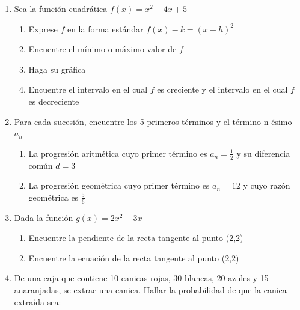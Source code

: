 \documentclass[letterpaper,fleqn]{article}
\begin{document}
\begin{enumerate}
\begin{enumerate}
\begin{enumerate}
\end{enumerate}
\end{enumerate}
\item Sea la función cuadrática $f(x)=x^{2}-4x+5$
\begin{enumerate}
\item Exprese $f$ en la forma estándar $f(x)-k=(x-h)^{2}$\noanswer
\newpage
\item Encuentre el mínimo o máximo valor de $f$\noanswer[20pt]
\item Haga su gráfica
\begin{center}
\end{center}
\item Encuentre el intervalo en el cual $f$ es creciente y el intervalo en el cual $f$ es decreciente \noanswer[30pt]
\end{enumerate}
\item Para cada sucesión, encuentre los 5 primeros términos y el término n-ésimo $a_{n}$
\begin{enumerate}
\item La progresión aritmética cuyo primer término es $a_{n}=\frac{1}{2}$ y su diferencia común $d=3$ \noanswer[50pt]
\item La progresión geométrica cuyo primer término es $a_{n}=12$ y cuyo razón geométrica es $\frac{5}{6}$ \noanswer[50pt]
\end{enumerate}
\item Dada la función $g(x)=2x^{2}-3x$ 
\begin{enumerate}
\item Encuentre la pendiente de la recta tangente al punto (2,2)\noanswer
\item Encuentre la ecuación de la recta tangente al punto (2,2)\noanswer
\end{enumerate}
\item De una caja que contiene 10 canicas rojas, 30 blancas, 20 azules y 15 anaranjadas, se extrae una canica. Hallar la probabilidad de que la canica extraída sea:
\begin{enumerate}
\end{enumerate}
 \end{enumerate}
\end{document}
